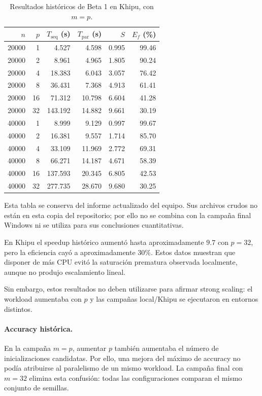 \documentclass[11pt,a4paper]{article}
\begin{document}
\begin{table}[H]
\centering
\small
\begin{tabular}{r r r r r r}
\toprule
$n$ & $p$ & $T_{\mathrm{seq}}$ (s) & $T_{\mathrm{par}}$ (s) &
$S$ & $E_f$ (\%) \\
\midrule
20000 & 1  & 4.527   & 4.598  & 0.995 & 99.46 \\
20000 & 2  & 8.961   & 4.965  & 1.805 & 90.24 \\
20000 & 4  & 18.383  & 6.043  & 3.057 & 76.42 \\
20000 & 8  & 36.431  & 7.368  & 4.913 & 61.41 \\
20000 & 16 & 71.312  & 10.798 & 6.604 & 41.28 \\
20000 & 32 & 143.192 & 14.882 & 9.661 & 30.19 \\
\midrule
40000 & 1  & 8.999   & 9.129  & 0.997 & 99.67 \\
40000 & 2  & 16.381  & 9.557  & 1.714 & 85.70 \\
40000 & 4  & 33.109  & 11.969 & 2.772 & 69.31 \\
40000 & 8  & 66.271  & 14.187 & 4.671 & 58.39 \\
40000 & 16 & 137.593 & 20.345 & 6.805 & 42.53 \\
40000 & 32 & 277.735 & 28.670 & 9.680 & 30.25 \\
\bottomrule
\end{tabular}
\caption{Resultados históricos de Beta 1 en Khipu, con $m=p$.}
\label{tab:khipu-resultados-historicos}
\end{table}

Esta tabla se conserva del informe actualizado del equipo. Sus archivos crudos
no están en esta copia del repositorio; por ello no se combina con la campaña
final Windows ni se utiliza para sus conclusiones cuantitativas.

En Khipu el speedup histórico aumentó hasta aproximadamente $9.7$ con $p=32$, pero la
eficiencia cayó a aproximadamente $30\%$. Estos datos muestran que disponer de más CPU
evitó la saturación prematura observada localmente, aunque no produjo escalamiento lineal.

Sin embargo, estos resultados no deben utilizarse para afirmar strong scaling: el
workload aumentaba con $p$ y las campañas local/Khipu se ejecutaron en entornos distintos.

\paragraph{Accuracy histórica.}
En la campaña $m=p$, aumentar $p$ también aumentaba el número de inicializaciones
candidatas. Por ello, una mejora del máximo de accuracy no podía atribuirse al
paralelismo de un mismo workload. La campaña final con $m=32$ elimina esta confusión:
todas las configuraciones comparan el mismo conjunto de semillas.
\end{document}
